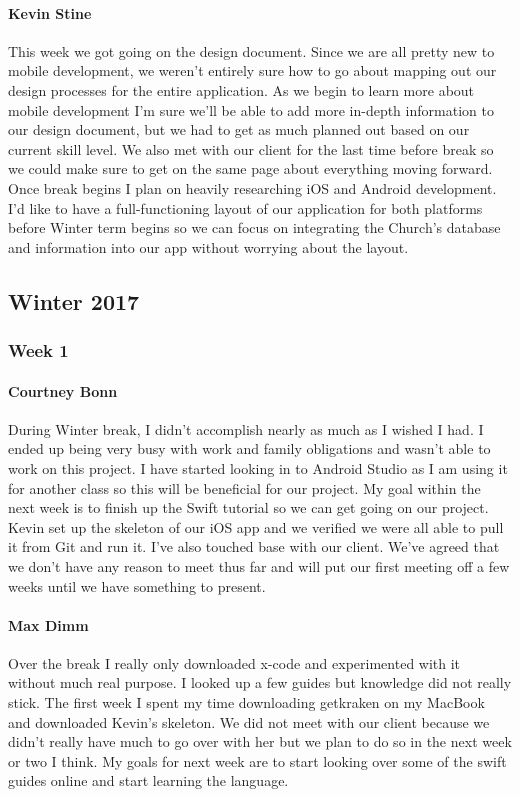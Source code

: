 			\paragraph{Kevin Stine}
			This week we got going on the design document. Since we are all pretty new to mobile development, we weren't entirely sure how to go about mapping out our design processes for the entire application. As we begin to learn more about mobile development I'm sure we'll be able to add more in-depth information to our design document, but we had to get as much planned out based on our current skill level. We also met with our client for the last time before break so we could make sure to get on the same page about everything moving forward. Once break begins I plan on heavily researching iOS and Android development. I'd like to have a full-functioning layout of our application for both platforms before Winter term begins so we can focus on integrating the Church's database and information into our app without worrying about the layout.

	\subsection{Winter 2017}

		\subsubsection{Week 1}

			\paragraph{Courtney Bonn}
			During Winter break, I didn't accomplish nearly as much as I wished I had. I ended up being very busy with work and family obligations and wasn't able to work on this project. I have started looking in to Android Studio as I am using it for another class so this will be beneficial for our project. My goal within the next week is to finish up the Swift tutorial so we can get going on our project. Kevin set up the skeleton of our iOS app and we verified we were all able to pull it from Git and run it. I've also touched base with our client. We've agreed that we don't have any reason to meet thus far and will put our first meeting off a few weeks until we have something to present.

			\paragraph{Max Dimm}
			Over the break I really only downloaded x-code and experimented with it without much real purpose. I looked up a few guides but knowledge did not really stick. The first week I spent my time downloading getkraken on my MacBook and downloaded Kevin's skeleton. We did not meet with our client because we didn't really have much to go over with her but we plan to do so in the next week or two I think. My goals for next week are to start looking over some of the swift guides online and start learning the language.

